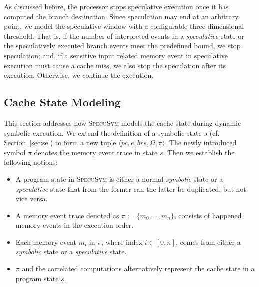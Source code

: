 \documentclass[sigconf,screen]{acmart}
\newcommand\ignore[1]{}
\newcommand{\pcon}{\mathit{pc}}
\newcommand{\SpecuSym}{\textsc{SpecuSym} }
\begin{document}
As discussed before, the processor stops speculative execution once it has computed
the branch destination. Since speculation may end at an arbitrary point, we model 
the speculative window with a configurable three-dimensional threshold. That is, if 
the number of interpreted events in a \textit{speculative} state or the speculatively 
executed branch events meet the predefined bound, we stop speculation; and, if a 
sensitive input related memory event in speculative execution must cause a cache miss, 
we also stop the speculation after its execution. Otherwise, we continue the execution.


\subsection{Cache State Modeling}
\label{sec:modeling}


This section addresses how \SpecuSym models the cache state during dynamic
symbolic execution. We extend the definition of a symbolic state $s$ (cf.
Section~\ref{sec:se}) to form a new tuple $\langle \pcon, \mathit{e},
\mathit{brs},\Omega,\pi\rangle$. The newly introduced symbol $\pi$ denotes 
the memory event trace in state $s$. Then we establish the following notions:
%
%
\begin{itemize}
  \item A program state in \SpecuSym is either a normal \textit{symbolic} state 
	or a \textit{speculative} state that from the former can the latter be 
	duplicated, but not vice versa. 
  \item A memory event trace denoted as $\pi:=\mathit{\{m_0,...,m_n\}}$, 
    consists of happened memory events in the execution order.
  \item Each memory event $\mathit{m_i}$ in $\pi$, where index $i\in [0,n]$, 
	comes from either a \textit{symbolic} state or a \textit{speculative} state.
  \item $\pi$ and the correlated computations alternatively represent the cache 
	state in a program state $s$.
\end{itemize}
%
%
\ignore{
On modeling the cache state, exsiting tools such as CaSym~\cite{BrotzmanLZTK2018} 
maintains and updates cache mappings during symbolic execution; others like 
Chalice~\cite{ChattopadhyayBRZ17} and \textsc{SymSC}~\cite{GuoWW18} uses 
offline constraint solving to to reason about the cache behaviors of memory 
accesses upon concrete cache models. To better coordinate the speculative 
modeling component, \SpecuSym adopts an on-the-fly analysis.
}
\end{document}
